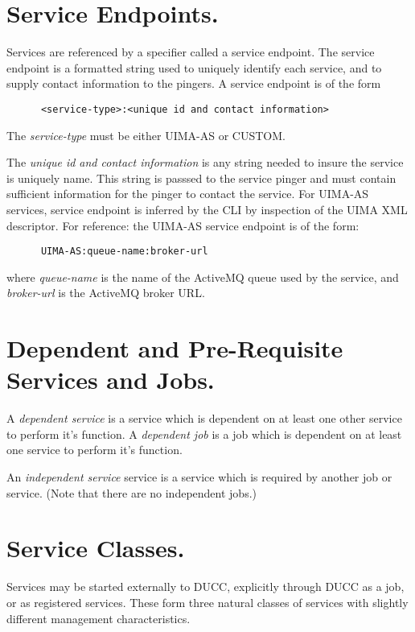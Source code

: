       \section{Service Endpoints.} Services are referenced by a specifier called a service
      endpoint. The service endpoint is a formatted string used to uniquely identify each
      service, and to supply contact information to the pingers.  A service endpoint
      is of the form 
\begin{verbatim}
      <service-type>:<unique id and contact information>
\end{verbatim}
      
      The {\em service-type} must be either UIMA-AS or CUSTOM.
      
      The {\em unique id and contact information} is any string needed to insure the service is
      uniquely name.  This string is passsed to the service pinger and must contain sufficient
      information for the pinger to contact the service.  For UIMA-AS services, service endpoint is
      inferred by the CLI by inspection of the UIMA XML descriptor.  For reference: the UIMA-AS
      service endpoint is of the form:
\begin{verbatim}
      UIMA-AS:queue-name:broker-url
\end{verbatim}
      where {\em queue-name} is the name of the ActiveMQ queue used by the service, and {\em broker-url}
      is the ActiveMQ broker URL.
      
      \section{Dependent and Pre-Requisite Services and Jobs.} A {\em dependent service} is a
      service which is dependent on at least one other service to perform it's function. A {\em
        dependent job} is a job which is dependent on at least one service to perform it's function.

      An {\em independent service} service is a service which is required by another job or
      service. (Note that there are no independent jobs.)

      \section{Service Classes.} Services may be started externally to DUCC, explicitly through
      DUCC as a job, or as registered services. These form three natural classes of services with
      slightly different management characteristics.

